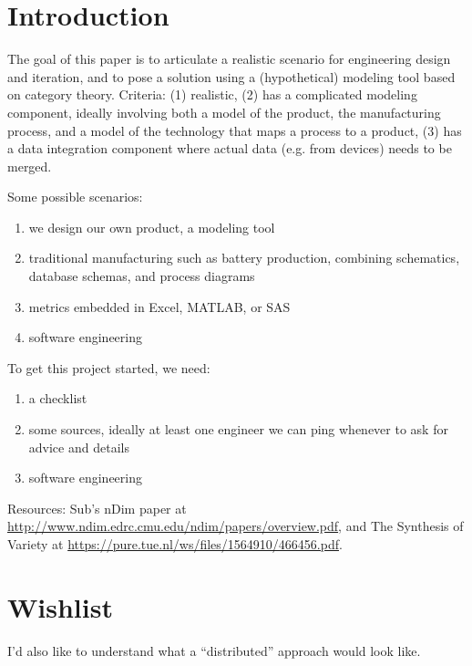 
\section{Introduction}

The goal of this paper is to articulate a realistic scenario for engineering design and iteration, and to pose a solution using a (hypothetical) modeling tool based on category theory. Criteria: (1) realistic, (2) has a complicated modeling component, ideally involving both a model of the product, the manufacturing process, and a model of the technology that maps a process to a product, (3) has a data integration component where actual data (e.g. from devices) needs to be merged.

Some possible scenarios: 
\begin{enumerate}
\item we design our own product, a modeling tool
\item traditional manufacturing such as battery production, combining schematics, database schemas, and process diagrams
\item metrics embedded in Excel, MATLAB, or SAS
\item software engineering
\end{enumerate}

To get this project started, we need:
\begin{enumerate}
\item a checklist
\item some sources, ideally at least one engineer we can ping whenever to ask for advice and details
\item software engineering
\end{enumerate}

Resources: Sub's nDim paper at \url{http://www.ndim.edrc.cmu.edu/ndim/papers/overview.pdf}, and The Synthesis of Variety at \url{https://pure.tue.nl/ws/files/1564910/466456.pdf}.

\section{Wishlist}
I'd also like to understand what a ``distributed'' approach would look like.